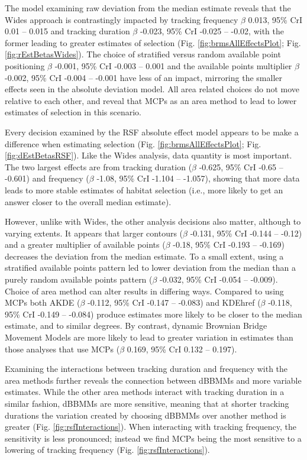 \documentclass[10pt,a4paper]{article}
\begin{document}
The model examining raw deviation from the median estimate reveals that the Wides approach is contrastingly impacted by tracking frequency \(\beta\) 0.013, 95\% CrI 0.01 -- 0.015 and tracking duration \(\beta\) -0.023, 95\% CrI -0.025 -- -0.02, with the former leading to greater estimates of selection (Fig. \ref{fig:brmsAllEffectsPlot}; Fig. \ref{fig:rEstBetasWides}).
The choice of stratified versus random available point positioning \(\beta\) -0.001, 95\% CrI -0.003 -- 0.001 and the available points multiplier \(\beta\) -0.002, 95\% CrI -0.004 -- -0.001 have less of an impact, mirroring the smaller effects seen in the absolute deviation model.
All area related choices do not move relative to each other, and reveal that MCPs as an area method to lead to lower estimates of selection in this scenario.

Every decision examined by the RSF absolute effect model appears to be make a difference when estimating selection (Fig. \ref{fig:brmsAllEffectsPlot}; Fig. \ref{fig:dEstBetasRSF}).
Like the Wides analysis, data quantity is most important.
The two largest effects are from tracking duration (\(\beta\) -0.625, 95\% CrI -0.65 -- -0.601) and frequency (\(\beta\) -1.08, 95\% CrI -1.104 -- -1.057), showing that more data leads to more stable estimates of habitat selection (i.e., more likely to get an answer closer to the overall median estimate).

However, unlike with Wides, the other analysis decisions also matter, although to varying extents.
It appears that larger contours (\(\beta\) -0.131, 95\% CrI -0.144 -- -0.12) and a greater multiplier of available points (\(\beta\) -0.18, 95\% CrI -0.193 -- -0.169) decreases the deviation from the median estimate.
To a small extent, using a stratified available points pattern led to lower deviation from the median than a purely random available points pattern (\(\beta\) -0.032, 95\% CrI -0.054 -- -0.009).
Choice of area method can alter results in differing ways.
Compared to using MCPs both AKDE (\(\beta\) -0.112, 95\% CrI -0.147 -- -0.083) and KDEhref (\(\beta\) -0.118, 95\% CrI -0.149 -- -0.084) produce estimates more likely to be closer to the median estimate, and to similar degrees.
By contrast, dynamic Brownian Bridge Movement Models are more likely to lead to greater variation in estimates than those analyses that use MCPs (\(\beta\) 0.169, 95\% CrI 0.132 -- 0.197).

Examining the interactions between tracking duration and frequency with the area methods further reveals the connection between dBBMMs and more variable estimates.
While the other area methods interact with tracking duration in a similar fashion, dBBMMs are more sensitive, meaning that at shorter tracking durations the variation created by choosing dBBMMs over another method is greater (Fig. \ref{fig:rsfInteractions}).
When interacting with tracking frequency, the sensitivity is less pronounced; instead we find MCPs being the most sensitive to a lowering of tracking frequency (Fig. \ref{fig:rsfInteractions}).
\end{document}
